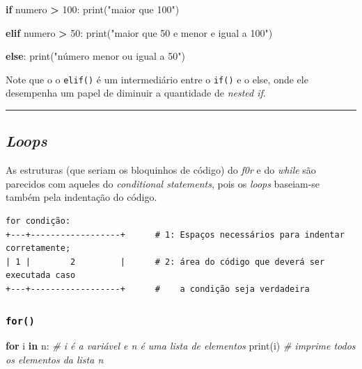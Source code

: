 \documentclass[]{book}
\newenvironment{Shaded}{\begin{snugshade}}{\end{snugshade}}
\newcommand{\KeywordTok}[1]{\textcolor[rgb]{0.13,0.29,0.53}{\textbf{#1}}}
\newcommand{\DecValTok}[1]{\textcolor[rgb]{0.00,0.00,0.81}{#1}}
\newcommand{\StringTok}[1]{\textcolor[rgb]{0.31,0.60,0.02}{#1}}
\newcommand{\CommentTok}[1]{\textcolor[rgb]{0.56,0.35,0.01}{\textit{#1}}}
\newcommand{\ControlFlowTok}[1]{\textcolor[rgb]{0.13,0.29,0.53}{\textbf{#1}}}
\newcommand{\OperatorTok}[1]{\textcolor[rgb]{0.81,0.36,0.00}{\textbf{#1}}}
\newcommand{\BuiltInTok}[1]{#1}
\newcommand{\NormalTok}[1]{#1}
\begin{document}
\begin{Shaded}
\begin{Highlighting}[]
\ControlFlowTok{if}\NormalTok{ numero }\OperatorTok{>} \DecValTok{100}\NormalTok{:}
    \BuiltInTok{print}\NormalTok{(}\StringTok{"maior que 100"}\NormalTok{)}

\ControlFlowTok{elif}\NormalTok{ numero }\OperatorTok{>} \DecValTok{50}\NormalTok{:}
    \BuiltInTok{print}\NormalTok{(}\StringTok{"maior que 50 e menor e igual a 100"}\NormalTok{)}

\ControlFlowTok{else}\NormalTok{:}
    \BuiltInTok{print}\NormalTok{(}\StringTok{"número menor ou igual a 50"}\NormalTok{)}
\end{Highlighting}
\end{Shaded}

Note que o o \texttt{elif()} é um intermediário entre o \texttt{if()} e
o else, onde ele desempenha um papel de diminuir a quantidade de
\emph{nested if}.

\begin{center}\rule{0.5\linewidth}{\linethickness}\end{center}

\subsection{\texorpdfstring{\emph{Loops}}{Loops}}\label{loops}

As estruturas (que seriam os bloquinhos de código) do \emph{f0r} e do
\emph{while} são parecidos com aqueles do \emph{conditional statements},
pois os \emph{loops} baseiam-se também pela indentação do código.

\begin{verbatim}
for condição:
+---+------------------+      # 1: Espaços necessários para indentar corretamente;
| 1 |        2         |      # 2: área do código que deverá ser executada caso
+---+------------------+      #    a condição seja verdadeira
\end{verbatim}

\subsubsection{\texorpdfstring{\texttt{for()}}{for()}}\label{for}

\begin{Shaded}
\begin{Highlighting}[]
\ControlFlowTok{for}\NormalTok{ i }\KeywordTok{in}\NormalTok{ n:     }\CommentTok{# i é a variável e n é uma lista de elementos}
    \BuiltInTok{print}\NormalTok{(i)    }\CommentTok{# imprime todos os elementos da lista n}
\end{Highlighting}
\end{Shaded}
\end{document}
